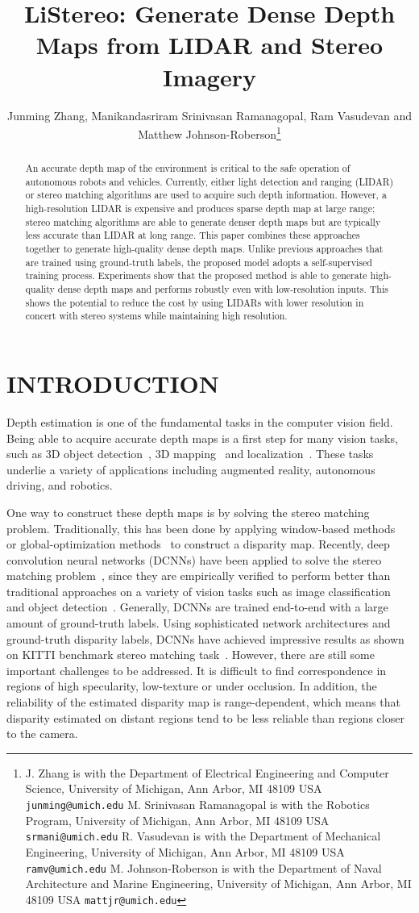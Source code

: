 \documentclass[letterpaper, 10 pt, conference]{ieeeconf}
\title{\LARGE \bf
LiStereo: Generate Dense Depth Maps from LIDAR and Stereo Imagery
}
\author{Junming Zhang, Manikandasriram Srinivasan Ramanagopal, Ram Vasudevan and Matthew Johnson-Roberson\thanks{
J. Zhang is with the Department of Electrical Engineering and Computer Science, University of Michigan, Ann Arbor, MI 48109 USA {\tt\small junming@umich.edu}
\newline \indent M. Srinivasan Ramanagopal is with the Robotics Program, University of Michigan, Ann Arbor, MI 48109 USA {\tt\small srmani@umich.edu}
\newline \indent R. Vasudevan is with the Department of Mechanical Engineering, University of Michigan, Ann Arbor, MI 48109 USA {\tt\small ramv@umich.edu}
\newline \indent M. Johnson-Roberson is with the Department of Naval Architecture and Marine Engineering, University of Michigan, Ann Arbor, MI 48109 USA {\tt\small mattjr@umich.edu}}
}
\begin{document}
\maketitle

\begin{abstract}
    An accurate depth map of the environment is critical to the safe operation of autonomous robots and vehicles. Currently, either light detection and ranging (LIDAR) or stereo matching algorithms are used to acquire such depth information. However, a high-resolution LIDAR is expensive and produces sparse depth map at large range; stereo matching algorithms are able to generate denser depth maps but are typically less accurate than LIDAR at long range. This paper combines these approaches together to generate high-quality dense depth maps. Unlike previous approaches that are trained using ground-truth labels, the proposed model adopts a self-supervised training process. Experiments show that the proposed method is able to generate high-quality dense depth maps and performs robustly even with low-resolution inputs. This shows the potential to reduce the cost by using LIDARs with lower resolution in concert with stereo systems while maintaining high resolution.
\end{abstract}


\section{INTRODUCTION}
    Depth estimation is one of the fundamental tasks in the computer vision field. Being able to acquire accurate depth maps is a first step for many vision tasks, such as 3D object detection~\cite{ku2018joint}, 3D mapping~\cite{zhang2015visual} and localization~\cite{wolcott2014visual}. These tasks underlie a variety of applications including augmented reality, autonomous driving, and robotics. 

    One way to construct these depth maps is by solving the stereo matching problem. 
Traditionally, this has been done by applying window-based methods~\cite{adhyapak2007stereo} or global-optimization methods~\cite{semiglobal} to construct a disparity map. Recently, deep convolution neural networks (DCNNs) have been applied to solve the stereo matching problem~\cite{zbontar2016stereo, mayer2016large}, since they are empirically verified to perform better than traditional approaches on a variety of vision tasks such as image classification~\cite{resnet} and object detection~\cite{MaskRCNN}. Generally, DCNNs are trained end-to-end with a large amount of ground-truth labels. Using sophisticated network architectures and ground-truth disparity labels, DCNNs have achieved impressive results as shown on KITTI benchmark stereo matching task~\cite{menze2015object}. However, there are still some important challenges to be addressed. It is difficult to find correspondence in regions of high specularity, low-texture or under  occlusion. In addition, the reliability of the estimated disparity map is range-dependent, which means that disparity estimated on distant regions tend to be less reliable than regions closer to the camera.
    
\end{document}
